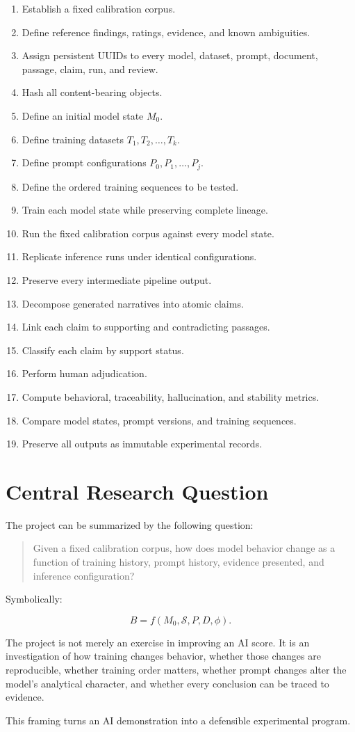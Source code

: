 \documentclass[11pt]{report}
\begin{document}
\begin{enumerate}
  \item Establish a fixed calibration corpus.
  \item Define reference findings, ratings, evidence, and known ambiguities.
  \item Assign persistent UUIDs to every model, dataset, prompt, document, passage, claim, run, and review.
  \item Hash all content-bearing objects.
  \item Define an initial model state $M_0$.
  \item Define training datasets $T_1,T_2,\ldots,T_k$.
  \item Define prompt configurations $P_0,P_1,\ldots,P_j$.
  \item Define the ordered training sequences to be tested.
  \item Train each model state while preserving complete lineage.
  \item Run the fixed calibration corpus against every model state.
  \item Replicate inference runs under identical configurations.
  \item Preserve every intermediate pipeline output.
  \item Decompose generated narratives into atomic claims.
  \item Link each claim to supporting and contradicting passages.
  \item Classify each claim by support status.
  \item Perform human adjudication.
  \item Compute behavioral, traceability, hallucination, and stability metrics.
  \item Compare model states, prompt versions, and training sequences.
  \item Preserve all outputs as immutable experimental records.
\end{enumerate}

\chapter{Central Research Question}

The project can be summarized by the following question:

\begin{quote}
Given a fixed calibration corpus, how does model behavior change as a function of training history, prompt history, evidence presented, and inference configuration?
\end{quote}

Symbolically:

\[
B=f(M_0,\mathcal{S},P,D,\phi).
\]

The project is not merely an exercise in improving an AI score. It is an investigation of how training changes behavior, whether those changes are reproducible, whether training order matters, whether prompt changes alter the model's analytical character, and whether every conclusion can be traced to evidence.

This framing turns an AI demonstration into a defensible experimental program.
\end{document}
